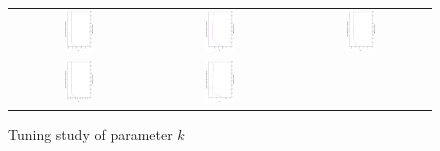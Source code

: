 \begin{figure}[t]
\centering
\caption{Tuning study of parameter $k$ }
\label{fig:Tuning}
\begin{tabular}{ccc}
\includegraphics[width=0.22\textwidth, angle=-90,origin=c]{Tuning/2obj_DTLZ4.eps} &
\includegraphics[width=0.22\textwidth, angle=-90,origin=c]{Tuning/2obj_DTLZ7.eps} &
\includegraphics[width=0.22\textwidth, angle=-90,origin=c]{Tuning/2obj_WFG8.eps} \\
\includegraphics[width=0.22\textwidth, angle=-90,origin=c]{Tuning/3obj_DTLZ4.eps} &
\includegraphics[width=0.22\textwidth, angle=-90,origin=c]{Tuning/3obj_DTLZ7.eps} &

\end{tabular}
\end{figure}
